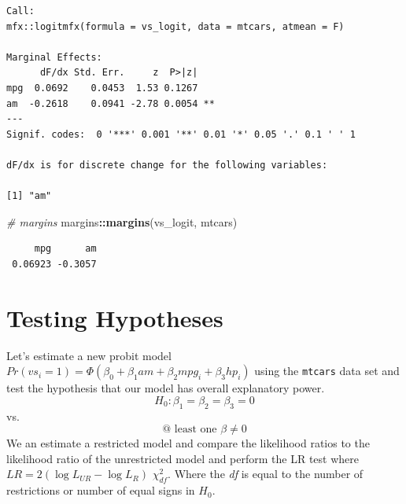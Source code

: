 \documentclass[]{book}
\newenvironment{Shaded}{\begin{snugshade}}{\end{snugshade}}
\newcommand{\CommentTok}[1]{\textcolor[rgb]{0.56,0.35,0.01}{\textit{#1}}}
\newcommand{\DataTypeTok}[1]{\textcolor[rgb]{0.13,0.29,0.53}{#1}}
\newcommand{\DecValTok}[1]{\textcolor[rgb]{0.00,0.00,0.81}{#1}}
\newcommand{\KeywordTok}[1]{\textcolor[rgb]{0.13,0.29,0.53}{\textbf{#1}}}
\newcommand{\NormalTok}[1]{#1}
\newcommand{\OperatorTok}[1]{\textcolor[rgb]{0.81,0.36,0.00}{\textbf{#1}}}
\newcommand{\StringTok}[1]{\textcolor[rgb]{0.31,0.60,0.02}{#1}}
\begin{document}
\begin{verbatim}
Call:
mfx::logitmfx(formula = vs_logit, data = mtcars, atmean = F)

Marginal Effects:
      dF/dx Std. Err.     z  P>|z|   
mpg  0.0692    0.0453  1.53 0.1267   
am  -0.2618    0.0941 -2.78 0.0054 **
---
Signif. codes:  0 '***' 0.001 '**' 0.01 '*' 0.05 '.' 0.1 ' ' 1

dF/dx is for discrete change for the following variables:

[1] "am"
\end{verbatim}

\begin{Shaded}
\begin{Highlighting}[]
\CommentTok{# margins}
\NormalTok{margins}\OperatorTok{::}\KeywordTok{margins}\NormalTok{(vs_logit, mtcars)}
\end{Highlighting}
\end{Shaded}

\begin{verbatim}
     mpg      am
 0.06923 -0.3057
\end{verbatim}

\hypertarget{testing-hypotheses}{%
\section{Testing Hypotheses}\label{testing-hypotheses}}

Let's estimate a new probit model \(Pr(vs_i=1)=\Phi(\beta_0+\beta_1am+\beta_2mpg_i+\beta_3hp_i)\) using the \texttt{mtcars} data set and test the hypothesis that our model has overall explanatory power. \[H_0:\beta_1=\beta_2=\beta_3=0\]
vs.~\[\text{@ least one }\beta\ne0\]
We an estimate a restricted model and compare the likelihood ratios to the likelihood ratio of the unrestricted model and perform the LR test where \(LR = 2(\log L_{UR}-\log L_R)\text{~}\chi^2_{df}\). Where the \emph{df} is equal to the number of restrictions or number of equal signs in \(H_0\).

\begin{Shaded}
\end{Shaded}
\end{document}
